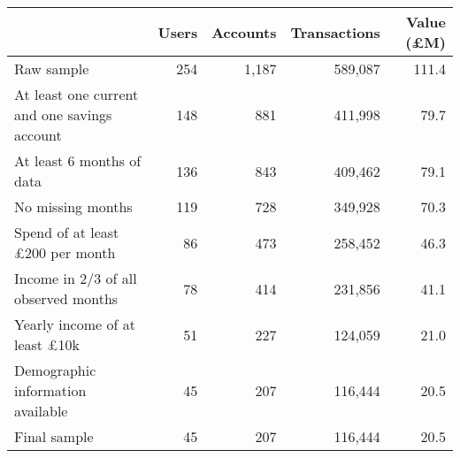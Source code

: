 \begin{tabular}{lrrrr}
\toprule
                                             & Users & Accounts & Transactions & Value (\pounds M) \\
\midrule
                                  Raw sample &   254 &    1,187 &      589,087 &             111.4 \\
At least one current and one savings account &   148 &      881 &      411,998 &              79.7 \\
                   At least 6 months of data &   136 &      843 &      409,462 &              79.1 \\
                           No missing months &   119 &      728 &      349,928 &              70.3 \\
            Spend of at least £200 per month &    86 &      473 &      258,452 &              46.3 \\
        Income in 2/3 of all observed months &    78 &      414 &      231,856 &              41.1 \\
        Yearly income of at least \pounds10k &    51 &      227 &      124,059 &              21.0 \\
           Demographic information available &    45 &      207 &      116,444 &              20.5 \\
                                Final sample &    45 &      207 &      116,444 &              20.5 \\
\bottomrule
\end{tabular}
